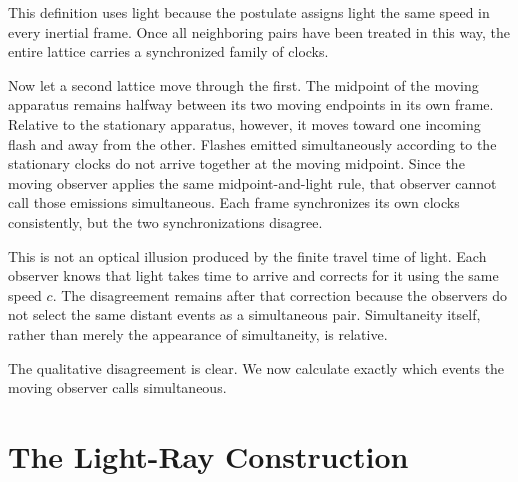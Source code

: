 This definition uses light because the postulate assigns light the same speed in every inertial frame. Once all neighboring pairs have been treated in this way, the entire lattice carries a synchronized family of clocks.

Now let a second lattice move through the first. The midpoint of the moving apparatus remains halfway between its two moving endpoints in its own frame. Relative to the stationary apparatus, however, it moves toward one incoming flash and away from the other. Flashes emitted simultaneously according to the stationary clocks do not arrive together at the moving midpoint. Since the moving observer applies the same midpoint-and-light rule, that observer cannot call those emissions simultaneous. Each frame synchronizes its own clocks consistently, but the two synchronizations disagree.

This is not an optical illusion produced by the finite travel time of light. Each observer knows that light takes time to arrive and corrects for it using the same speed \(c\). The disagreement remains after that correction because the observers do not select the same distant events as a simultaneous pair. Simultaneity itself, rather than merely the appearance of simultaneity, is relative.

\begin{classroomqa}
\end{classroomqa}

The qualitative disagreement is clear. We now calculate exactly which events the moving observer calls simultaneous.

\section{The Light-Ray Construction}

